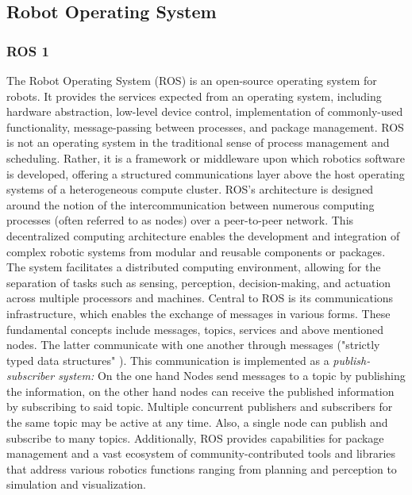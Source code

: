 \documentclass[]{article}
\begin{document}
	
	
	\subsection{Robot Operating System}
	\subsubsection{ROS 1}
	The Robot Operating System (ROS) is an open-source operating system for robots. It provides the services expected from an operating system, including hardware abstraction, low-level device control, implementation of commonly-used functionality, message-passing between processes, and package management. ROS is not an operating system in the traditional sense of process management and scheduling. Rather, it is a framework or middleware upon which robotics software is developed, offering a structured communications layer above the host operating systems of a heterogeneous compute cluster. \autocite{quigleyROSOpensourceRobot2009,ros.orgIntroductionROS2024}
	ROS's architecture is designed around the notion of the intercommunication between numerous computing processes (often referred to as nodes) over a peer-to-peer network. This decentralized computing architecture enables the development and integration of complex robotic systems from modular and reusable components or packages. The system facilitates a distributed computing environment, allowing for the separation of tasks such as sensing, perception, decision-making, and actuation across multiple processors and machines. \autocite{quigleyROSOpensourceRobot2009}
	Central to ROS is its communications infrastructure, which enables the exchange of messages in various forms. These fundamental concepts include messages, topics, services and above mentioned nodes. The latter communicate with one another through messages ("strictly typed data structures" \autocite{quigleyROSOpensourceRobot2009}). This communication is implemented as a \textit{publish-subscriber system:} On the one hand Nodes send messages to a topic by publishing the information, on the other hand nodes can receive the published information by subscribing to said topic. Multiple concurrent publishers and subscribers for the same topic may be active at any time. Also, a single node can publish and subscribe to many topics. \autocite{quigleyROSOpensourceRobot2009}
	Additionally, ROS provides capabilities for package management and a vast ecosystem of community-contributed tools and libraries that address various robotics functions ranging from planning and perception to simulation and visualization.
	\autocite{quigleyROSOpensourceRobot2009,ros.orgIntroductionROS2024}
\end{document}
